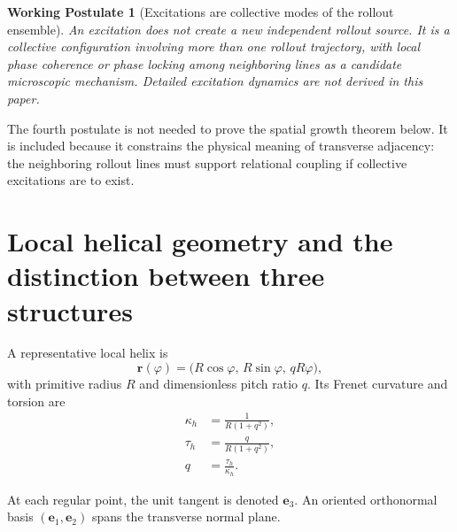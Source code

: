 \documentclass[11pt]{article}
\newtheorem{assumption}{Working Postulate}
\begin{document}
\begin{assumption}[Excitations are collective modes of the rollout ensemble]
An excitation does not create a new independent rollout source. It is a collective configuration involving more than one rollout trajectory, with local phase coherence or phase locking among neighboring lines as a candidate microscopic mechanism. Detailed excitation dynamics are not derived in this paper.
\end{assumption}

The fourth postulate is not needed to prove the spatial growth theorem below. It is included because it constrains the physical meaning of transverse adjacency: the neighboring rollout lines must support relational coupling if collective excitations are to exist.

\section{Local helical geometry and the distinction between three structures}

A representative local helix is
\begin{equation}
\mathbf r(\varphi)
=
\bigl(R\cos\varphi,\,
R\sin\varphi,\,
qR\varphi\bigr),
\label{eq:helix}
\end{equation}
with primitive radius \(R\) and dimensionless pitch ratio \(q\). Its Frenet curvature and torsion are
\begin{equation}
\begin{aligned}
\kappa_h &= \frac{1}{R(1+q^2)},\\
\tau_h &= \frac{q}{R(1+q^2)},\\
q &= \frac{\tau_h}{\kappa_h}.
\end{aligned}
\end{equation}

At each regular point, the unit tangent is denoted \(\mathbf e_3\). An oriented orthonormal basis \((\mathbf e_1,\mathbf e_2)\) spans the transverse normal plane.
\end{document}

